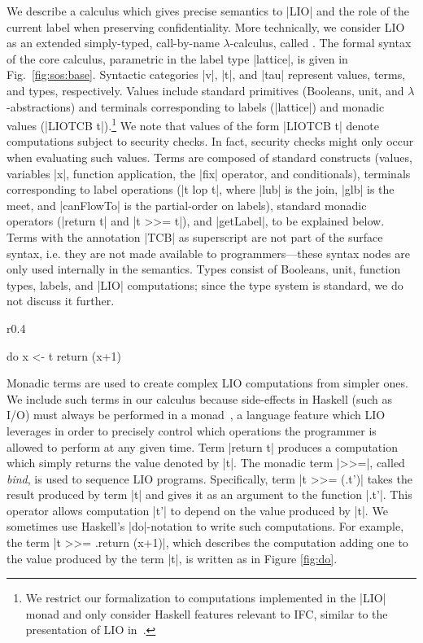 We describe a calculus which gives precise semantics to |LIO| and the role of
the current label when preserving confidentiality. More technically, we consider
LIO as an extended simply-typed, call-by-name $\lambda$-calculus, called \lio.
%
The formal syntax of the core \lio{} calculus, parametric in the label
type |lattice|, is given in Fig.~\ref{fig:sos:base}.
%
Syntactic categories |v|, |t|, and |tau| represent values, terms, and
types, respectively.
%
Values include standard primitives (Booleans, unit, and $\lambda$-abstractions)
and terminals corresponding to labels (|lattice|) and monadic values (|LIOTCB
t|).\footnote{ We restrict our formalization to computations implemented in the
  |LIO| monad and only consider Haskell features relevant to IFC, similar to the
  presentation of LIO in~\cite{stefan:lio,stefan:addressing-covert}.  } We note
that values of the form |LIOTCB t| denote computations subject to security
checks. In fact, security checks might only occur when evaluating such values.
%
Terms are composed of standard constructs (values, variables |x|, function
application, the |fix| operator, and conditionals), terminals corresponding to
label operations (|t lop t|, where |lub| is the join, |glb| is the meet, and
|canFlowTo| is the partial-order on labels), standard monadic operators (|return
t| and |t >>= t|), and |getLabel|, to be explained below.
%
Terms with the annotation |TCB| as superscript are not part of the surface
syntax, i.e. they are not made available to programmers---these syntax nodes
are only used internally in the semantics.
%
Types consist of Booleans, unit, function types, labels, and |LIO|
computations; since the \lio{} type system is standard, we do not
discuss it further.

\begin{wrapfigure}{r}{0.4\columnwidth}
\vspace{-15pt}
\begin{code}
do  x <- t 
    return (x+1) 
\end{code}
\vspace{-15pt}
\caption{\label{fig:do}|do|-notation}
\end{wrapfigure}
Monadic terms are used to create complex LIO computations from simpler
ones.
%
We include such terms in our calculus because side-effects in
Haskell (such as I/O) must always be performed in a monad~\cite{moggi:monads,wadler:monads}, a
language feature which LIO leverages in order to precisely control
which operations the programmer is allowed to perform at any given
time.
%
Term |return t| produces a computation which simply returns the value
denoted by |t|. The monadic term |>>=|, called \emph{bind}, is used to sequence
LIO programs. Specifically, term |t >>= (\x.t')| takes the result produced by
term |t| and gives it as an argument to the function |\x.t'|.  This operator
allows computation |t'| to depend on the value produced by |t|.  We sometimes
use Haskell’s |do|-notation to write such computations. For example, the term |t
>>= \x.return (x+1)|, which describes the computation adding one to the value
produced by the term |t|, is written as in Figure \ref{fig:do}.

